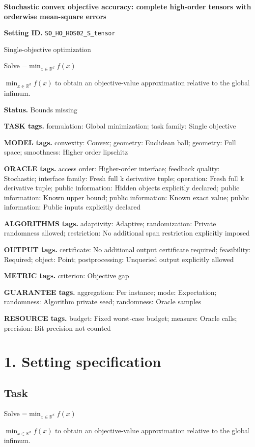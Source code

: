 \documentclass[10pt,a4paper]{article}
\newcommand{\AtlasMath}[1]{\par\begingroup\centering\setbox0=\hbox{$\displaystyle #1$}\ifdim\wd0>1.4\linewidth\typeout{ATLAS WIDE FORMULA: \the\wd0}\fi\ifdim\wd0>\linewidth\resizebox{\linewidth}{!}{\box0}\else\box0\fi\par\endgroup}
\newcommand{\AtlasInlineMath}[1]{\begingroup\setbox0=\hbox{$#1$}\ifdim\wd0>.4\linewidth\endgroup\AtlasMath{#1}\else\endgroup$#1$\fi}
\begin{document}
\raggedright

{\LARGE\bfseries\sffamily\color{AtlasNavy} Stochastic convex objective accuracy: complete high-order tensors with orderwise mean-square errors\par}\vspace{5pt}
\textbf{Setting ID.} \texttt{SO\_\allowbreak{}HO\_\allowbreak{}HOS02\_\allowbreak{}S\_\allowbreak{}tensor}

Single-objective optimization

Solve \AtlasInlineMath{\min_{x\in \mathbb{R}^d}f(x)} to obtain an objective-value approximation relative to the global infimum.

\textbf{Status.} Bounds missing

\textbf{TASK tags.} formulation: Global minimization; task family: Single objective

\textbf{MODEL tags.} convexity: Convex; geometry: Euclidean ball; geometry: Full space; smoothness: Higher order lipschitz

\textbf{ORACLE tags.} access order: Higher-order interface; feedback quality: Stochastic; interface family: Fresh full k derivative tuple; operation: Fresh full k derivative tuple; public information: Hidden objects explicitly declared; public information: Known upper bound; public information: Known exact value; public information: Public inputs explicitly declared

\textbf{ALGORITHMS tags.} adaptivity: Adaptive; randomization: Private randomness allowed; restriction: No additional span restriction explicitly imposed

\textbf{OUTPUT tags.} certificate: No additional output certificate required; feasibility: Required; object: Point; postprocessing: Unqueried output explicitly allowed

\textbf{METRIC tags.} criterion: Objective gap

\textbf{GUARANTEE tags.} aggregation: Per instance; mode: Expectation; randomness: Algorithm private seed; randomness: Oracle samples

\textbf{RESOURCE tags.} budget: Fixed worst-case budget; measure: Oracle calls; precision: Bit precision not counted

\section{1. Setting specification}
\subsection{Task}
Solve \AtlasInlineMath{\min_{x\in \mathbb{R}^d}f(x)} to obtain an objective-value approximation relative to the global infimum.
\end{document}
